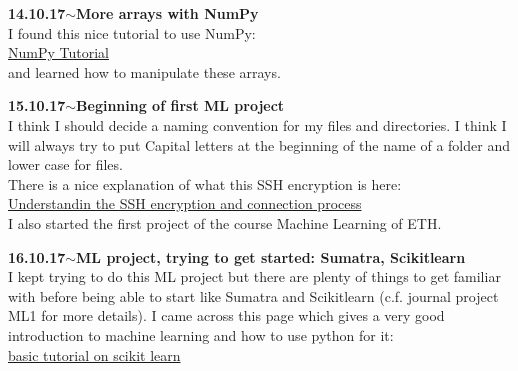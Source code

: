 \documentclass[11pt,a4paper]{article}
\newenvironment{loggentry}[2]%
{\noindent\textbf{#1}\hspace{1cm}$\mathbf{\sim}$\text{ }\textbf{#2}\\}{\vspace{0.5cm}}
\begin{document}
\begin{loggentry}{14.10.17}{More arrays with NumPy}
I found this nice tutorial to use NumPy:\\
\href{https://docs.scipy.org/doc/numpy-dev/user/quickstart.html}{NumPy Tutorial}\\
and learned how to manipulate these arrays. 
\end{loggentry}

\begin{loggentry}{15.10.17}{Beginning of first ML project}
I think I should decide a naming convention for my files and directories. I think I will always try to put Capital letters at the beginning of the name of a folder and lower case for files.\\
There is a nice explanation of what this SSH encryption is here:\\
\href{https://www.digitalocean.com/community/tutorials/understanding-the-ssh-encryption-and-connection-process}{Understandin the SSH encryption and connection process}\\
I also started the first project of the course Machine Learning of ETH.\\
\end{loggentry}

\begin{loggentry}{16.10.17}{ML project, trying to get started:  Sumatra, Scikitlearn}
I kept trying to do this ML project but there are plenty of things to get familiar with before being able to start like Sumatra and Scikitlearn (c.f. journal project ML1 for more details). I came across this page which gives a very good introduction to machine learning and how to use python for it:\\
\href{http://scikit-learn.org/stable/tutorial/basic/tutorial.html}{basic tutorial on scikit learn}\\
\end{loggentry}
\end{document}
